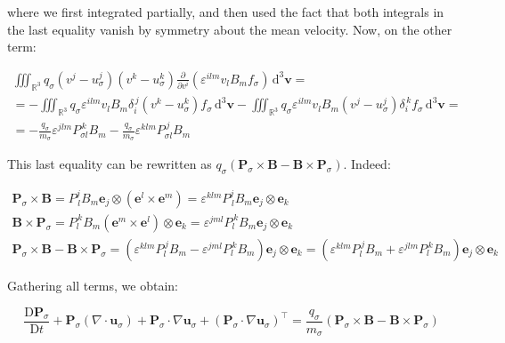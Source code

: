 where we first integrated partially, and then used the fact that both integrals in the last equality vanish by symmetry about the mean velocity. Now, on the other term:

\begin{gather*}
    \iiint_{\mathbb{R}^3}q_\sigma \left(v^j-u_\sigma^j\right)\left(v^k-u_\sigma^k\right)\frac{\partial }{\partial v^i}\left(\varepsilon^{ilm}v_l B_m f_\sigma\right)\,\mathrm{d^3}\mathbf{v}=\\
    =-\iiint_{\mathbb{R}^3}q_\sigma\varepsilon^{ilm}v_l B_m\delta_i^{\,j}\left(v^k-u_\sigma^k\right)f_\sigma\,\mathrm{d^3}\mathbf{v}-\iiint_{\mathbb{R}^3}q_\sigma\varepsilon^{ilm}v_l B_m \left(v^j-u_\sigma^j\right) \delta_i^{\,k}f_\sigma\,\mathrm{d^3}\mathbf{v}=\\
    =-\frac{q_\sigma}{m_\sigma}\varepsilon^{jlm}P_{\sigma l}^{\,k}B_m-\frac{q_\sigma}{m_\sigma}\varepsilon^{klm}P_{\sigma l}^{\,j}B_m
\end{gather*}

This last equality can be rewritten as $q_\sigma \left(\mathbf{P}_\sigma\times \mathbf{B}-\mathbf{B}\times \mathbf{P}_\sigma\right)$. Indeed:

\begin{gather*}
    \mathbf{P}_\sigma\times \mathbf{B}=P^j_{\,l}B_m \mathbf{e}_j\otimes \left(\mathbf{e}^l\times \mathbf{e}^m\right)=\varepsilon^{klm}P^j_{\,l}B_m \mathbf{e}_j\otimes\mathbf{e}_k\\
    \mathbf{B}\times \mathbf{P}_\sigma = P_{l}^{\,k}B_m \left(\mathbf{e}^m\times \mathbf{e}^l\right)\otimes \mathbf{e}_k=\varepsilon^{jml}P_l^{\,k}B_m \mathbf{e}_j\otimes \mathbf{e}_k\\
    \mathbf{P}_\sigma\times \mathbf{B}-\mathbf{B}\times \mathbf{P}_\sigma=\left(\varepsilon^{klm}P_l^{\,j}B_m-\varepsilon^{jml}P_l^{\,k}B_m\right)\mathbf{e}_j\otimes \mathbf{e}_k=\left(\varepsilon^{klm}P_l^{\,j}B_m+\varepsilon^{jlm}P_l^{\,k}B_m\right)\mathbf{e}_j\otimes \mathbf{e}_k
\end{gather*}   

Gathering all terms, we obtain:

\begin{equation}
    \frac{\mathrm{D}\mathbf{P}_\sigma}{\mathrm{D}t}+\mathbf{P}_\sigma \left(\nabla\cdot{\mathbf{u}_\sigma}\right)+\mathbf{P}_\sigma\cdot\nabla \mathbf{u}_\sigma+\left(\mathbf{P}_\sigma \cdot\nabla \mathbf{u}_\sigma\right)^\top=\frac{q_\sigma}{m_\sigma}\left(\mathbf{P}_\sigma\times \mathbf{B}-\mathbf{B}\times \mathbf{P}_{\sigma}\right)
\end{equation}

